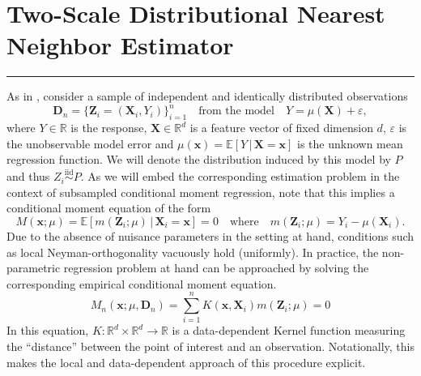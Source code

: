 \documentclass[letterpaper,10pt]{article}
\numberwithin{equation}{section}
\numberwithin{theorem}{section}
\numberwithin{remark}{section}
\numberwithin{example}{section}
\theoremstyle{definition}
\newcommand{\1}{\mathbb{1}}
\begin{document}
\section{Two-Scale Distributional Nearest Neighbor Estimator}\label{TDNN}
\hrule
As in \citet{demirkaya_optimal_2024}, consider a sample of independent and identically distributed observations
\begin{equation}\label{DGP}
	\mathbf{D}_n = \{\mathbf{Z}_i = (\mathbf{X}_i, Y_i)\}_{i = 1}^{n}
	\quad \text{from the model} \quad
	Y = \mu(\mathbf{X}) + \varepsilon,
\end{equation}
where $Y \in \mathbb{R}$ is the response, $\mathbf{X} \in \mathbb{R}^d$ is a feature vector of fixed dimension $d$, $\varepsilon$ is the unobservable model error and $\mu(\mathbf{x}) = \mathbb{E}\left[Y \, | \, \mathbf{X} = \mathbf{x}\right]$ is the unknown mean regression function.
We will denote the distribution induced by this model by $P$ and thus $Z_i \overset{\text{iid}}{\sim} P$.
As we will embed the corresponding estimation problem in the context of subsampled conditional moment regression, note that this implies a conditional moment equation of the form
\begin{equation}\label{CondMomEq}
	M(\mathbf{x}; \mu)
	= \mathbb{E}\left[m(\mathbf{Z}_i; \mu) \, | \, \mathbf{X}_i = \mathbf{x}\right]
	= 0
	\quad \text{where} \quad
	m(\mathbf{Z}_i; \mu) = Y_i - \mu(\mathbf{X}_i).
\end{equation}
Due to the absence of nuisance parameters in the setting at hand, conditions such as local Neyman-orthogonality vacuously hold (uniformly).
In practice, the non-parametric regression problem at hand can be approached by solving the corresponding empirical conditional moment equation.
\begin{equation}\label{EmpCondMomEq}
	M_n(\mathbf{x}; \mu, \mathbf{D}_n)
	= \sum_{i = 1}^{n}K(\mathbf{x}, \mathbf{X}_i)m(\mathbf{Z}_i; \mu)
	= 0
\end{equation}
In this equation, $K:\mathbb{R}^d \times \mathbb{R}^d \rightarrow \mathbb{R}$ is a data-dependent Kernel function measuring the ``distance'' between the point of interest and an observation.
Notationally, this makes the local and data-dependent approach of this procedure explicit.
\end{document}
